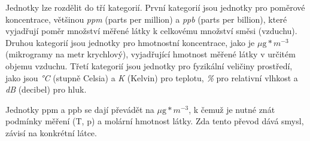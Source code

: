 Jednotky lze rozdělit do tří kategorií. První kategorií jsou jednotky pro poměrové koncentrace, většinou \textit{ppm} (parts per million) a \textit{ppb} (parts per billion), které vyjadřují poměr množství měřené látky k celkovému množství směsi (vzduchu). Druhou kategorií jsou jednotky pro hmotnostní koncentrace, jako je \textit{$\mu\text{g}*m^{-3}$} (mikrogramy na metr krychlový), vyjadřující hmotnost měřené látky v určitém objemu vzduchu. Třetí kategorií jsou jednotky pro fyzikální veličiny prostředí, jako jsou \textit{°C} (stupně Celsia) a \textit{K} (Kelvin) pro teplotu, \textit{\%} pro relativní vlhkost a \textit{dB} (decibel) pro hluk.\parencite{worldhealthorganizationWHOGlobalAir2021}

Jednotky ppm a ppb se dají převádět na $\mu\text{g}*m^{-3}$, k čemuž je nutné znát podmínky měření (T, p) a molární hmotnost látky. Zda tento převod dává smysl, závisí na konkrétní látce.\parencite{worldhealthorganizationWHOGlobalAir2021}

